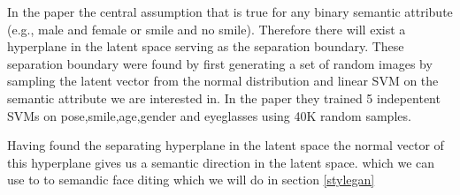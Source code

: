 In the paper the central assumption that is true for any binary semantic attribute (e.g., male  and female or smile and no smile).\cite{interfacegan} Therefore there will exist a hyperplane in the latent space serving as the separation boundary.
These  separation boundary were  found by first generating a set of random images by sampling the latent vector from the normal distribution and linear SVM on the semantic attribute we are interested in.
In the paper they trained 5 indepentent SVMs on pose,smile,age,gender and eyeglasses using 40K random samples.

Having found the separating hyperplane in the latent space the normal vector of this hyperplane gives us a semantic direction in the latent space. which we can use to to semandic face diting which we will do in section \ref{stylegan}









%
%



%
%
%
